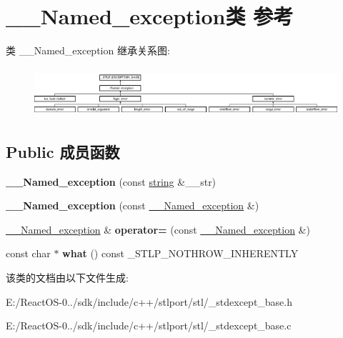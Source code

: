 \hypertarget{class_____named__exception}{}\section{\+\_\+\+\_\+\+Named\+\_\+exception类 参考}
\label{class_____named__exception}
类 \+\_\+\+\_\+\+Named\+\_\+exception 继承关系图\+:\begin{figure}[H]
\begin{center}
\leavevmode
\includegraphics[height=1.828571cm]{class_____named__exception}
\end{center}
\end{figure}
\subsection*{Public 成员函数}
\begin{DoxyCompactItemize}
\item 
\mbox{\label{class_____named__exception_a3f5e723a72db9edf125ebb7bae269369}} 
{\bfseries \+\_\+\+\_\+\+Named\+\_\+exception} (const \hyperlink{structstring}{string} \&\+\_\+\+\_\+str)
\item 
\mbox{\label{class_____named__exception_a35d32cf070357ea223a685b0a4fc0110}} 
{\bfseries \+\_\+\+\_\+\+Named\+\_\+exception} (const \hyperlink{class_____named__exception}{\+\_\+\+\_\+\+Named\+\_\+exception} \&)
\item 
\mbox{\label{class_____named__exception_a5ad10cbca9a87c4a532a24031582239f}} 
\hyperlink{class_____named__exception}{\+\_\+\+\_\+\+Named\+\_\+exception} \& {\bfseries operator=} (const \hyperlink{class_____named__exception}{\+\_\+\+\_\+\+Named\+\_\+exception} \&)
\item 
\mbox{\label{class_____named__exception_a11a1685e4ac0dc80948c63d1a93e74b7}} 
const char $\ast$ {\bfseries what} () const \+\_\+\+S\+T\+L\+P\+\_\+\+N\+O\+T\+H\+R\+O\+W\+\_\+\+I\+N\+H\+E\+R\+E\+N\+T\+LY
\end{DoxyCompactItemize}


该类的文档由以下文件生成\+:\begin{DoxyCompactItemize}
\item 
E\+:/\+React\+O\+S-\/0../sdk/include/c++/stlport/stl/\+\_\+stdexcept\+\_\+base.\+h\item 
E\+:/\+React\+O\+S-\/0../sdk/include/c++/stlport/stl/\+\_\+stdexcept\+\_\+base.\+c\end{DoxyCompactItemize}
